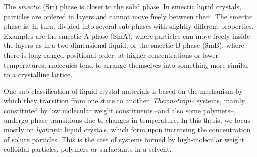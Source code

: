 The {\em smectic} (Sm) phase is closer to the solid phase. In smectic liquid crystals, particles are ordered in layers and cannot move freely between them. The smectic phase is, in turn, divided into several sub-phases with slightly different properties. Examples are the smectic A phase (SmA), where particles can move freely inside the layers as in a two-dimensional liquid; or the smectic B phase (SmB), where there is long-ranged positional order: at higher concentrations or lower temperatures, molecules tend to arrange themselves into something more similar to a crystalline lattice.

One sub-classification of liquid crystal materials is based on the mechanism by which they transition from one state to another. {\em Thermotropic} systems, mainly constituted by low molecular weight constituents --and also some polymers--, undergo phase transitions due to changes in temperature. In this thesis, we focus mostly on  {\em lyotropic} liquid crystals, which form upon increasing the concentration of solute particles. This is the case of systems formed by high-molecular weight colloidal particles, polymers or surfactants in a solvent.

